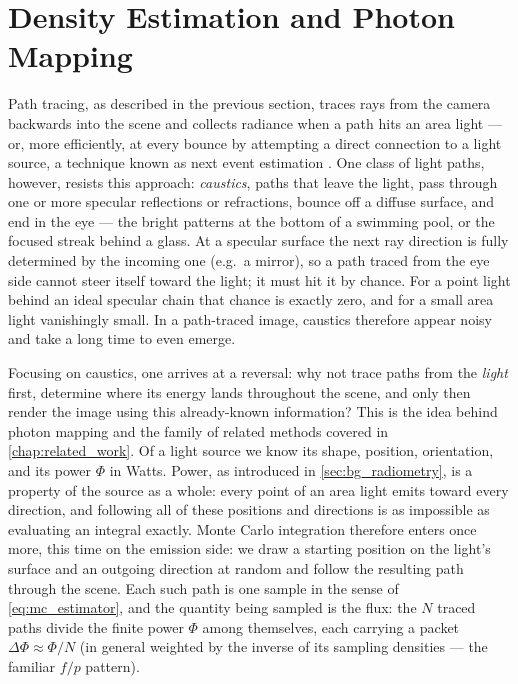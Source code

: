 \section{Density Estimation and Photon Mapping}
\label{sec:bg_density_estimation}

Path tracing, as described in the previous section, traces rays from the camera backwards into the scene and collects radiance when a path hits an area light --- or, more efficiently, at every bounce by attempting a direct connection to a light source, a technique known as next event estimation \cite{pharr23pbrt}. One class of light paths, however, resists this approach: \emph{caustics}, paths that leave the light, pass through one or more specular reflections or refractions, bounce off a diffuse surface, and end in the eye --- the bright patterns at the bottom of a swimming pool, or the focused streak behind a glass. At a specular surface the next ray direction is fully determined by the incoming one (e.g.\ a mirror), so a path traced from the eye side cannot steer itself toward the light; it must hit it by chance. For a point light behind an ideal specular chain that chance is exactly zero, and for a small area light vanishingly small. In a path-traced image, caustics therefore appear noisy and take a long time to even emerge.

Focusing on caustics, one arrives at a reversal: why not trace paths from the \emph{light} first, determine where its energy lands throughout the scene, and only then render the image using this already-known information? This is the idea behind photon mapping \cite{jensen96} and the family of related methods covered in \cref{chap:related_work}. Of a light source we know its shape, position, orientation, and its power $\Phi$ in Watts. Power, as introduced in \cref{sec:bg_radiometry}, is a property of the source as a whole: every point of an area light emits toward every direction, and following all of these positions and directions is as impossible as evaluating an integral exactly. Monte Carlo integration therefore enters once more, this time on the emission side: we draw a starting position on the light's surface and an outgoing direction at random and follow the resulting path through the scene. Each such path is one sample in the sense of \cref{eq:mc_estimator}, and the quantity being sampled is the flux: the $N$ traced paths divide the finite power $\Phi$ among themselves, each carrying a packet $\Delta\Phi \approx \Phi/N$ (in general weighted by the inverse of its sampling densities --- the familiar $f/p$ pattern).

